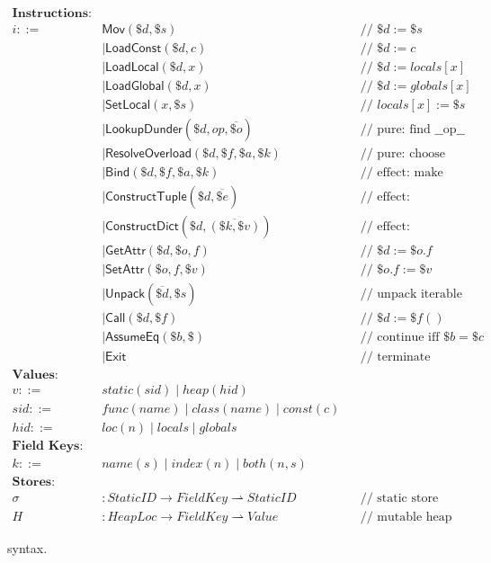 \begin{figure}[t]
\centering
\[
\begin{aligned}
\textbf{Instructions:} && \\
i ::= \;& \mathsf{Mov}(\$d, \$s) && \text{// } \$d := \$s \\
      &\mid \mathsf{LoadConst}(\$d, c) && \text{// } \$d := c \\
      &\mid \mathsf{LoadLocal}(\$d, x) && \text{// } \$d := \mathit{locals}[x] \\
      &\mid \mathsf{LoadGlobal}(\$d, x) && \text{// } \$d := \mathit{globals}[x] \\
      &\mid \mathsf{SetLocal}(x, \$s) && \text{// } \mathit{locals}[x] := \$s \\[0.5ex]
      &\mid \mathsf{LookupDunder}(\$d, op, \overline{\$o})  && \text{// pure: find \_\_op\_\_}\\
      &\mid \mathsf{ResolveOverload}(\$d, \$f, \$a, \$k) && \text{// pure: choose static target} \\
      &\mid \mathsf{Bind}(\$d, \$f, \$a, \$k) && \text{// effect: make bound callable} \\
      &\mid \mathsf{ConstructTuple}(\$d, \overline{\$e}) && \text{// effect: allocate/populate tuple} \\
      &\mid \mathsf{ConstructDict}(\$d, \overline{(\$k, \$v)}) && \text{// effect: allocate/populate dict} \\[0.5ex]
      &\mid \mathsf{GetAttr}(\$d, \$o, f) && \text{// } \$d := \$o.f \\
      &\mid \mathsf{SetAttr}(\$o, f, \$v) && \text{// } \$o.f := \$v \\
      &\mid \mathsf{Unpack}(\overline{\$d}, \$s) && \text{// unpack iterable} \\
      &\mid \mathsf{Call}(\$d, \$f) && \text{// } \$d := \$f() \\[0.5ex]
      &\mid \mathsf{AssumeEq}(\$b, \$) && \text{// continue iff } \$b = \$c \\
      &\mid \mathsf{Exit} && \text{// terminate} \\[1ex]
\textbf{Values:} && \\
v ::= \;& \mathit{static}(sid) \mid \mathit{heap}(hid) \\[0.5ex]
sid ::= \;& \mathit{func}(name) \mid \mathit{class}(name) \mid \mathit{const}(c) \\
hid ::= \;& \mathit{loc}(n) \mid \mathit{locals} \mid \mathit{globals} \\[1ex]
\textbf{Field Keys:} && \\
k ::= \;& \mathit{name}(s) \mid \mathit{index}(n) \mid \mathit{both}(n, s) \\[1ex]
\textbf{Stores:} && \\
\sigma &: \mathit{StaticID} \to \mathit{FieldKey} \rightharpoonup \mathit{StaticID} && \text{// static store (closed)} \\
H &: \mathit{HeapLoc} \to \mathit{FieldKey} \rightharpoonup \mathit{Value} && \text{// mutable heap}
\end{aligned}
\]
\caption{\spytecode syntax.}
\label{fig:tac-syntax}
\end{figure}
